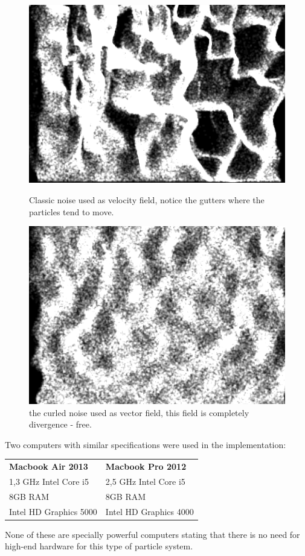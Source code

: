 \documentclass[report]{vgtc}
\begin{document}
\begin{figure}[H]
\includegraphics[scale=0.5]{img/noise.png}
\caption{Classic noise used as velocity field, notice the gutters where the particles tend to move.}
\includegraphics[scale=0.5]{img/curl-noise.png}
\caption{the curled noise used as vector field, this field is completely divergence - free.}
\end{figure}

Two computers with similar specifications were used in the implementation:
\def\arraystretch{1.5}%
	\begin{table}[H]
		\begin{tabular}{| ll |}
			\hline
			\textbf{Macbook Air 2013} & \textbf{Macbook Pro 2012} \\[0.75ex] %
			 1,3 GHz Intel Core i5  &   2,5 GHz Intel Core i5  \\[0.75ex]
			  8GB RAM & 8GB RAM    \\[0.75ex]
		 	 Intel HD Graphics 5000 &  Intel HD Graphics 4000   \\ [0.75ex]
			\hline
		\end{tabular}
	\end{table}	
None of these are specially powerful computers stating that there is no need for high-end hardware for this type of particle system. 
\end{document}
